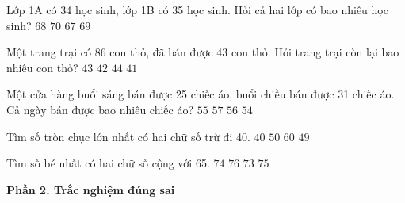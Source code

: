 \begin{ex} %
Lớp 1A có 34 học sinh, lớp 1B có 35 học sinh. Hỏi cả hai lớp có bao nhiêu học sinh?
\choice
{$68$}
{$70$}
{$67$}
{\True $69$}
\end{ex}

\begin{ex} %
Một trang trại có 86 con thỏ, đã bán được 43 con thỏ. Hỏi trang trại còn lại bao nhiêu con thỏ?
\choice
{\True $43$}
{$42$}
{$44$}
{$41$}
\end{ex}

\begin{ex} %
Một cửa hàng buổi sáng bán được 25 chiếc áo, buổi chiều bán được 31 chiếc áo. Cả ngày bán được bao nhiêu chiếc áo?
\choice
{$55$}
{$57$}
{\True $56$}
{$54$}
\end{ex}

\begin{ex} %
Tìm số tròn chục lớn nhất có hai chữ số trừ đi 40.
\choice
{$40$}
{\True $50$}
{$60$}
{$49$}
\end{ex}

\begin{ex} %
Tìm số bé nhất có hai chữ số cộng với 65.
\choice
{$74$}
{$76$}
{$73$}
{\True $75$}
\end{ex}

\textbf{Phần 2. Trắc nghiệm đúng sai}

